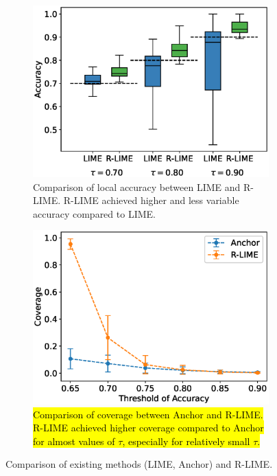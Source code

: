 \documentclass[runningheads]{llncs}
\begin{document}
{\begin{figure}[t]
  \begin{subfigure}[t]{0.48\textwidth}
    \centering
    \includegraphics[scale=0.36,valign=t]{exp2/box_plot}
    \caption[Comparison of Local Accuracy between R-LIME and LIME]{%
      Comparison of local accuracy between LIME and R-LIME\@.
      R-LIME achieved higher and less variable accuracy compared to LIME\@.
    }\label{fig:box-plot}
  \end{subfigure}
  \hfill
  \begin{subfigure}[t]{0.48\textwidth}
    \centering
    \includegraphics[scale=0.35,valign=t]{exp2b/comp_cov}
    \vspace{3pt}
    \caption[Comparison of Coverage between Anchor and R-LIME]{%
      \hl{%
        Comparison of coverage between Anchor and R-LIME\@.
        R-LIME achieved higher coverage compared to Anchor
        for almost values of $\tau$, especially for relatively small $\tau$.
      }
    }\label{fig:coverage}
  \end{subfigure}
  \caption{Comparison of existing methods (LIME, Anchor) and R-LIME.}
\end{figure}

}
\end{document}
